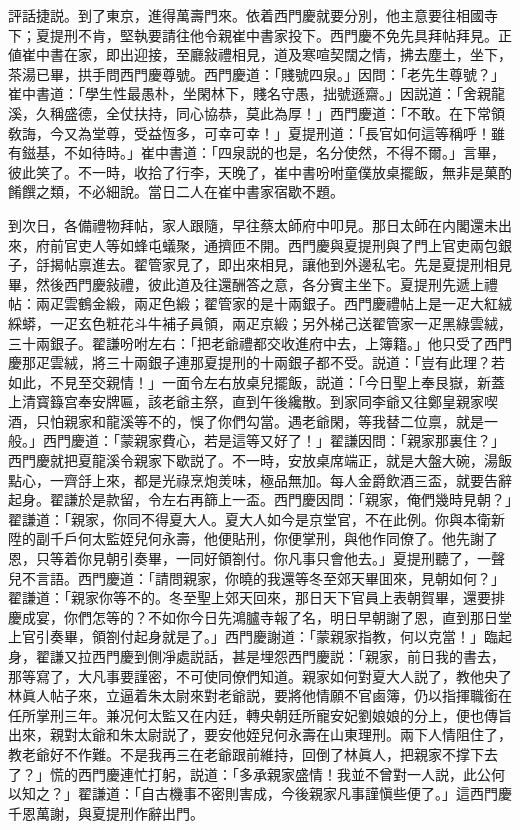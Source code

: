 評話捷説。到了東京，進得萬壽門來。依着西門慶就要分別，他主意要往相國寺下；夏提刑不肯，堅執要請往他令親崔中書家投下。西門慶不免先具拜帖拜見。正値崔中書在家，即出迎接，至廳敍禮相見，道及寒喧契闊之情，拂去塵土，坐下，茶湯已畢，拱手問西門慶尊號。西門慶道：「賤號四泉。」因問：「老先生尊號？」崔中書道：「學生性最愚朴，坐閑林下，賤名守愚，拙號遜齋。」因説道：「舍親龍溪，久稱盛德，全仗扶持，同心協恭，莫此為厚！」西門慶道：「不敢。在下常領敎誨，今又為堂尊，受益恆多，可幸可幸！」夏提刑道：「長官如何這等稱呼！雖有鎡基，不如待時。」崔中書道：「四泉説的也是，名分使然，不得不爾。」言畢，彼此笑了。不一時，收拾了行李，天晚了，崔中書吩咐童僕放桌擺飯，無非是菓酌餚饌之類，不必細說。當日二人在崔中書家宿歇不題。

到次日，各備禮物拜帖，家人跟隨，早往蔡太師府中叩見。那日太師在内閣還未出來，府前官吏人等如蜂屯蟻聚，通擠匝不開。西門慶與夏提刑與了門上官吏兩包銀子，㧱揭帖禀進去。翟管家見了，即出來相見，讓他到外邊私宅。先是夏提刑相見畢，然後西門慶敍禮，彼此道及往還酬答之意，各分賓主坐下。夏提刑先遞上禮帖：兩疋雲鶴金緞，兩疋色緞；翟管家的是十兩銀子。西門慶禮帖上是一疋大紅絨綵蟒，一疋玄色粧花斗牛補子員領，兩疋京緞；另外梯己送翟管家一疋黑綠雲絨，三十兩銀子。翟謙吩咐左右：「把老爺禮都交收進府中去，上簿籍。」他只受了西門慶那疋雲絨，將三十兩銀子連那夏提刑的十兩銀子都不受。説道：「豈有此理？若如此，不見至交親情！」一面令左右放桌兒擺飯，説道：「今日聖上奉艮嶽，新蓋上清寳籙宫奉安牌匾，該老爺主祭，直到午後纔散。到家同李爺又往鄭皇親家喫酒，只怕親家和龍溪等不的，悞了你們勾當。遇老爺閑，等我替二位禀，就是一般。」西門慶道：「蒙親家費心，若是這等又好了！」翟謙因問：「親家那裏住？」西門慶就把夏龍溪令親家下歇説了。不一時，安放桌席端正，就是大盤大碗，湯飯點心，一齊㧱上來，都是光祿烹炮羙味，極品無加。每人金爵飲酒三盃，就要告辭起身。翟謙於是款留，令左右再篩上一盃。西門慶因問：「親家，俺們幾時見朝？」翟謙道：「親家，你同不得夏大人。夏大人如今是京堂官，不在此例。你與本衛新陞的副千戶何太監姪兒何永壽，他便貼刑，你便掌刑，與他作同僚了。他先謝了恩，只等着你見朝引奏畢，一同好領劄付。你凡事只會他去。」夏提刑聽了，一聲兒不言語。西門慶道：「請問親家，你曉的我還等冬至郊天畢囬來，見朝如何？」翟謙道：「親家你等不的。冬至聖上郊天回來，那日天下官員上表朝賀畢，還要排慶成宴，你們怎等的？不如你今日先鴻臚寺報了名，明日早朝謝了恩，直到那日堂上官引奏畢，領劄付起身就是了。」西門慶謝道：「蒙親家指教，何以克當！」臨起身，翟謙又拉西門慶到側凈處説話，甚是埋怨西門慶説：「親家，前日我的書去，那等寫了，大凡事要謹密，不可使同僚們知道。親家如何對夏大人説了，教他央了林眞人帖子來，立逼着朱太尉來對老爺説，要將他情願不官鹵簿，仍以指揮職銜在任所掌刑三年。兼况何太監又在内廷，轉央朝廷所寵安妃劉娘娘的分上，便也傳旨出來，親對太爺和朱太尉説了，要安他姪兒何永壽在山東理刑。兩下人情阻住了，教老爺好不作難。不是我再三在老爺跟前維持，回倒了林眞人，把親家不撑下去了？」慌的西門慶連忙打躬，説道：「多承親家盛情！我並不曾對一人説，此公何以知之？」翟謙道：「自古機事不密則害成，今後親家凡事謹愼些便了。」這西門慶千恩萬謝，與夏提刑作辭出門。

